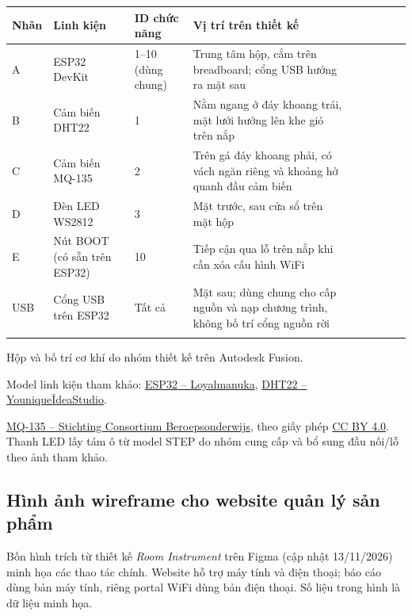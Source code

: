 \documentclass[12pt,a4paper]{article}
\renewcommand{\normalsize}{\fontsize{13pt}{13pt}\selectfont}
\renewcommand{\small}{\fontsize{12pt}{12pt}\selectfont}
\renewcommand{\footnotesize}{\fontsize{11pt}{11pt}\selectfont}
\newcommand{\outerline}{\Xhline{0.9pt}}
\begin{document}
\small
\begin{tabularx}{\linewidth}{I C{1.0cm} i L{3.5cm} i C{2.4cm} i Y I}
\outerline
{}\textbf{Nhãn} & \textbf{Linh kiện} & \textbf{ID chức năng} & \textbf{Vị trí trên thiết kế} \\
\hline
A & ESP32 DevKit & 1--10 (dùng chung) & Trung tâm hộp, cắm trên breadboard; cổng USB hướng ra mặt sau \\
\hline
B & Cảm biến DHT22 & 1 & Nằm ngang ở đáy khoang trái, mặt lưới hướng lên khe gió trên nắp \\
\hline
C & Cảm biến MQ-135 & 2 & Trên gá đáy khoang phải, có vách ngăn riêng và khoảng hở quanh đầu cảm biến \\
\hline
D & Đèn LED WS2812 & 3 & Mặt trước, sau cửa sổ trên mặt hộp \\
\hline
E & Nút BOOT (có sẵn trên ESP32) & 10 & Tiếp cận qua lỗ trên nắp khi cần xóa cấu hình WiFi \\
\hline
USB & Cổng USB trên ESP32 & Tất cả & Mặt sau; dùng chung cho cấp nguồn và nạp chương trình, không bố trí cổng nguồn rời \\
\outerline
\end{tabularx}
\normalsize

{\footnotesize\raggedright Hộp và bố trí cơ khí do nhóm thiết kế trên Autodesk Fusion.\par
Model linh kiện tham khảo: \href{https://sketchfab.com/3d-models/esp32-devkitc-32d-3d-model-step-269445-9e64cc503f5e4923a0a381b7d73fdaac}{ESP32 -- Loyalmanuka},
\href{https://sketchfab.com/3d-models/dht22-temperature-sensor-module-c46a658784034c679e4907bbddad0093}{DHT22 -- YouniqueĪdeaStudio}.\par
\href{https://sketchfab.com/3d-models/luchtkwaliteit-sensor-mq-135-gas-sensor-mq-135-394803dd013545a8b15ac4ba0f38e1be}{MQ-135 -- Stichting Consortium Beroepsonderwijs},
theo giấy phép \href{https://creativecommons.org/licenses/by/4.0/}{CC BY 4.0}.
Thanh LED lấy tám ô từ model STEP do nhóm cung cấp và bổ sung đầu nối/lỗ theo ảnh tham khảo.\par}

\clearpage
\subsection{Hình ảnh wireframe cho website quản lý sản phẩm}
\label{sec:wireframe}
Bốn hình trích từ thiết kế \emph{Room Instrument} trên Figma (cập nhật 13/11/2026) minh họa các thao tác chính. Website hỗ trợ máy tính và điện thoại; báo cáo dùng bản máy tính, riêng portal WiFi dùng bản điện thoại. Số liệu trong hình là dữ liệu minh họa.
\end{document}
